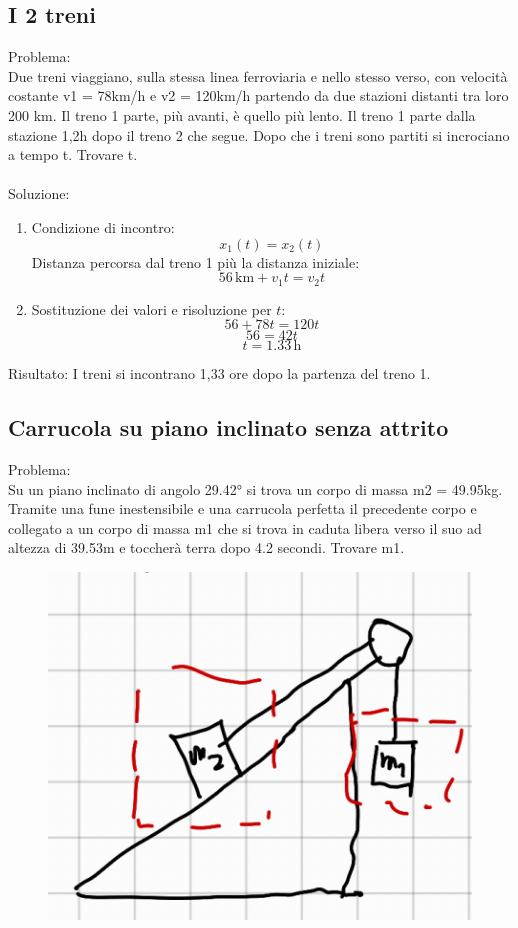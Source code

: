 \documentclass{article}
\begin{document}
\subsection{I 2 treni}
Problema:\\
Due treni viaggiano, sulla stessa linea ferroviaria e nello stesso verso, con velocità costante v1 = 78km/h e v2 = 120km/h partendo da due stazioni distanti tra loro 200 km. Il treno 1 parte, più avanti, è quello più lento. Il treno 1 parte dalla stazione 1,2h dopo il treno 2 che segue. Dopo che i treni sono partiti si incrociano a tempo t. Trovare t. \\
\\
Soluzione:
\begin{enumerate}
    \item Condizione di incontro:
    \[ x_1(t) = x_2(t) \]
    Distanza percorsa dal treno 1 più la distanza iniziale:
    \[ 56 \, \text{km} + v_1 t = v_2 t \]
    \item Sostituzione dei valori e risoluzione per \( t \):
    \[ 56 + 78t = 120t \]
    \[ 56 = 42t \]
    \[ t = 1.33 \, \text{h} \]
\end{enumerate}

\noindent Risultato:
I treni si incontrano 1,33 ore dopo la partenza del treno 1.
\newpage
\subsection{Carrucola su piano inclinato senza attrito}
Problema:\\
Su un piano inclinato di angolo 29.42° si trova un corpo di massa m2 = 49.95kg. Tramite una fune inestensibile e una carrucola perfetta il precedente corpo e collegato a un corpo di massa m1 che si trova in caduta libera verso il suo ad altezza di 39.53m e toccherà terra dopo 4.2 secondi. Trovare m1.
\begin{figure}[ht]
    \centering
    \includegraphics[width=0.5\linewidth]{Immagini/pianoinclinatocarrucola.png}
\end{figure}
\end{document}

